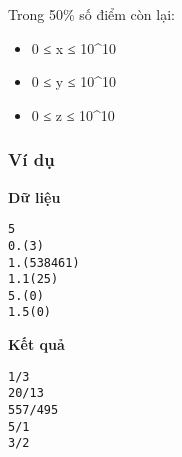    Trong 50\% số điểm còn lại:  
\begin{itemize}
	\item     0 ≤ x ≤ 10^10   
	\item     0 ≤ y ≤ 10^10   
	\item     0 ≤ z ≤ 10^10   
\end{itemize}

\subsubsection{   Ví dụ  }

\textbf{    Dữ liệu   }
\begin{verbatim}
5
0.(3)
1.(538461)
1.1(25)
5.(0)
1.5(0)
\end{verbatim}

\textbf{    Kết quả   }
\begin{verbatim}
1/3
20/13
557/495
5/1
3/2
\end{verbatim}
